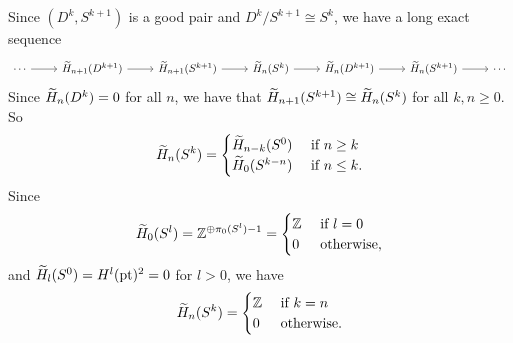 \begin{exam}
  Since $(D^k,S^{k+1})$ is a good pair and $D^k/S^{k+1} \cong S^k$, we have a long exact sequence
  \begin{equation*}
    \begin{tikzcd}
      \cdots \ar[r] & \wt H_{n+1}(D^{k+1}) \ar[r] & \wt H_{n+1}(S^{k+1}) \ar[r] & \wt H_n(S^k) \ar[r] & \wt H_n(D^{k+1}) \ar[r] & \wt H_n(S^{k+1}) \ar[r] & \cdots
    \end{tikzcd}
  \end{equation*}
  Since $\widetilde H_n(D^k)=0$ for all $n$, we have that $\widetilde H_{n+1}(S^{k+1}) \cong \widetilde H_n(S^k)$ for all $k,n \geq 0$.
  So
  \begin{equation*}
    \widetilde H_n(S^k)=
    \begin{cases}
      \widetilde H_{n-k}(S^0) & \text{ if } n \geq k \\
      \widetilde H_0(S^{k-n}) & \text{ if } n \leq k.
    \end{cases}
  \end{equation*}
  Since
  \begin{equation*}
    \widetilde H_0(S^l)=\mathbb{Z}^{\oplus \pi_0(S^l)-1}=
    \begin{cases}
      \mathbb{Z} & \text{ if } l=0 \\
      0 & \text{ otherwise,}
    \end{cases}
  \end{equation*}
  and $\widetilde H_l(S^0) = H^l(\operatorname{pt})^2 = 0$ for $l>0$, we have
  \begin{equation*}
    \widetilde H_n(S^k)=
    \begin{cases}
      \mathbb{Z} & \text{ if } k=n \\
      0 & \text{ otherwise.}
    \end{cases}
  \end{equation*}
\end{exam}
